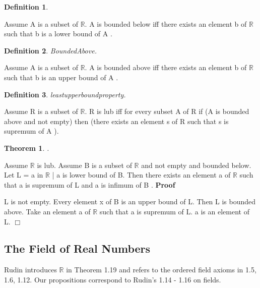 \documentclass{article}
\newenvironment{forthel}{\begin{leftbar}}{\end{leftbar}}
\newenvironment{proof}{\noindent\textbf{Proof\ }}{\hspace*{\fill}$\Box$\medskip}
\newtheorem{theorem}{Theorem}
\newtheorem{definition}{Definition}
\newcommand{\RR}{\mathbb{R}}
\begin{document}
\begin{forthel}
\begin{definition}
\end{definition}
Assume A is a subset of $\mathbb{R}$.
A is bounded below  iff 
there exists an element b of $\mathbb{R}$ such that b is a lower bound of A .

\begin{definition} BoundedAbove.

\end{definition}
Assume A is a subset of $\mathbb{R}$.
A is bounded above  iff 
there exists an element b of $\mathbb{R}$ such that b is an upper bound of A .

\begin{definition} leastupperboundproperty.

\end{definition}
Assume R is a subset of $\mathbb{R}$.
R is lub iff for every subset A of R
if (A is bounded above and not empty) then (there exists an element s of R such that s is supremum of A ).

\begin{theorem}
.
\end{theorem}
Assume $\mathbb{R}$ is lub.
Assume B is a subset of $\mathbb{R}$ and not empty and bounded below.
Let L = {a in $\mathbb{R}$ | a is lower bound of B}.
Then there exists an element a of $\mathbb{R}$ such that a is supremum of L and a is infimum of B .
\begin{proof}

L is not empty.
Every element x of B is an upper bound of L.
Then L is bounded above.
Take an element a of $\mathbb{R}$ such that a is supremum of L.
a is an element of L.
\end{proof}





\end{forthel}

\subsection{The Field of Real Numbers}

Rudin introduces $\RR$ in Theorem 1.19 and refers to the ordered field 
axioms in 1.5, 1.6, 1.12. Our propositions correspond to Rudin's 1.14 - 1.16 on fields. 
\end{document}
